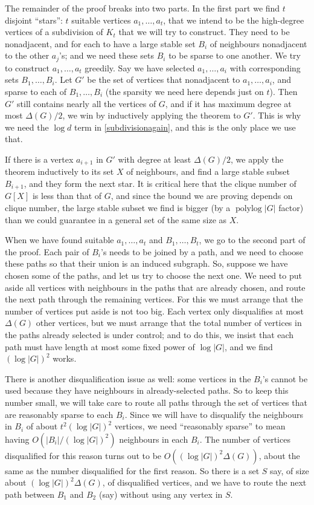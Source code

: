 \documentclass[titlepage,11pt]{article}
\def\LL{,\ldots,}
\def\polylog{\operatorname{polylog}}
\begin{document}
The remainder of the proof 
breaks into two parts. In the first part we find $t$ disjoint ``stars'': $t$ suitable vertices $a_1\LL a_t$, that we intend to be the high-degree vertices
of a subdivision of $K_t$ that we will try to construct. They need to be nonadjacent, and for each to have a large stable set $B_i$ of 
neighbours nonadjacent to the other $a_j$'s; and we need these sets $B_i$ to be sparse to one another.
We try to construct $a_1\LL a_t$ greedily. Say we have selected $a_1\LL a_i$ with corresponding sets $B_1\LL B_i$. Let $G'$ be the 
set of vertices that nonadjacent to $a_1\LL a_i$, and sparse to each of $B_1\LL B_i$ (the sparsity we need here depends just on $t$).
Then $G'$ still contains nearly all the vertices of $G$, and if it has maximum degree at most $\Delta(G)/2$,
we win
by inductively applying the theorem to $G'$. This is why we need the $\log d$ term in \ref{subdivisionagain},
and this is the only place we use that.

If there is a vertex $a_{i+1}$ in $G'$ with degree at least $\Delta(G)/2$, we apply the theorem inductively to its set $X$ of neighbours,
and find a large stable subset $B_{i+1}$, and they form the next star. It is critical here that the clique number of $G[X]$ is less 
than that of $G$, and since the bound we are proving depends on clique number, the large stable subset we find is bigger (by a 
$\polylog|G|$ factor) than we could guarantee in a general set of the same size as $X$.

When we have found suitable $a_1\LL a_t$ and $B_1\LL B_t$, we go to the second part of the proof. Each pair of $B_i$'s 
needs to be joined by a path, and we need to choose these paths so that their union is an induced subgraph. So, suppose we have 
chosen some of the paths, and let us try to choose the next one. We need to put aside all vertices with neighbours in the paths 
that are already chosen, and route the next path through the remaining vertices. For this we must arrange that the number of 
vertices put aside is not too big. Each vertex only disqualifies at most $\Delta(G)$ other vertices, but we must arrange that 
the total number of vertices in the paths already selected is under control; and to do this, we insist that each path must have 
length at most some fixed power of $\log|G|$,
and we find $(\log |G|)^2$ works. 

There is another disqualification issue as well: some vertices in the $B_i$'s cannot be used because they have neighbours in 
already-selected paths. So to keep this number small, we will take care to route all paths through the set of vertices that are reasonably sparse to each $B_i$. 
Since we will have
to disqualify the neighbours in $B_i$ of about $t^2(\log|G|)^2$ vertices, we need ``reasonably sparse'' to mean having 
$O(|B_i|/(\log|G|)^2)$ neighbours in each $B_i$. The number of vertices disqualified for this reason turns out to be $O((\log|G|)^2\Delta(G))$, about the same as the number disqualified for the first reason.
So there is a set $S$ say, of size about $(\log|G|)^2\Delta(G)$, of disqualified vertices, and we have to route the next path between
$B_1$ and $B_2$ (say) without using any vertex in $S$. 
\end{document}
